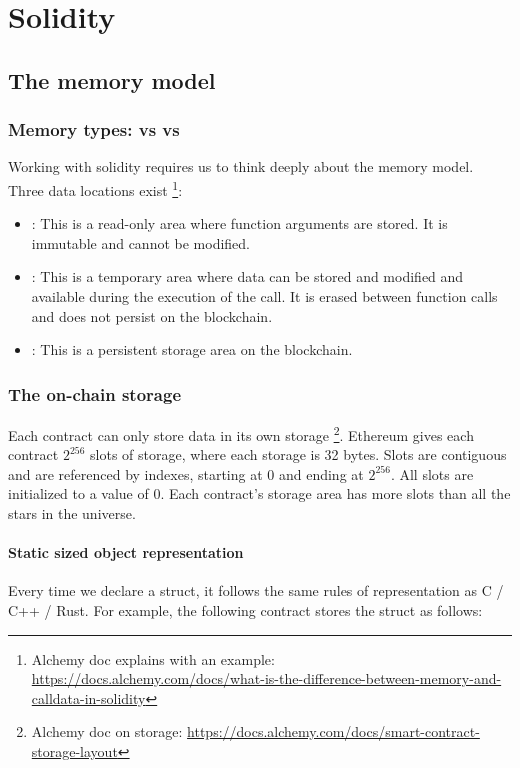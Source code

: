 
\chapter{Solidity}

\section{The memory model}

\subsection{Memory types:  vs  vs }
\label{sec:soliditity-memory-model}
Working with solidity requires us to think deeply about the memory model. Three data locations exist \footnote{ Alchemy doc explains with an example: \href{https://docs.alchemy.com/docs/what-is-the-difference-between-memory-and-calldata-in-solidity}{https://docs.alchemy.com/docs/what-is-the-difference-between-memory-and-calldata-in-solidity} 
}:
\begin{itemize}
    \item {}: This is a read-only area where function arguments are stored. It is immutable and cannot be modified.
    \item {}: This is a temporary area where data can be stored and modified and available during the execution of the call. It is erased between function calls and does not persist on the blockchain.
    \item {}: This is a persistent storage area on the blockchain.
\end{itemize}

\subsection{The on-chain storage}
Each contract can only store data in its own storage \footnote{Alchemy doc on storage: \href{https://docs.alchemy.com/docs/smart-contract-storage-layout}{https://docs.alchemy.com/docs/smart-contract-storage-layout}}. Ethereum gives each contract $2^{256}$ slots of storage, where each storage is 32 bytes. Slots are contiguous and are referenced by indexes, starting at 0 and ending at $2^{256}$. All slots are initialized to a value of 0. Each contract's storage area has more slots than all the stars in the universe.

\subsubsection{Static sized object representation}
Every time we declare a struct, it follows the same rules of representation as C / C++ / Rust.
For example, the following contract stores the struct as follows:

